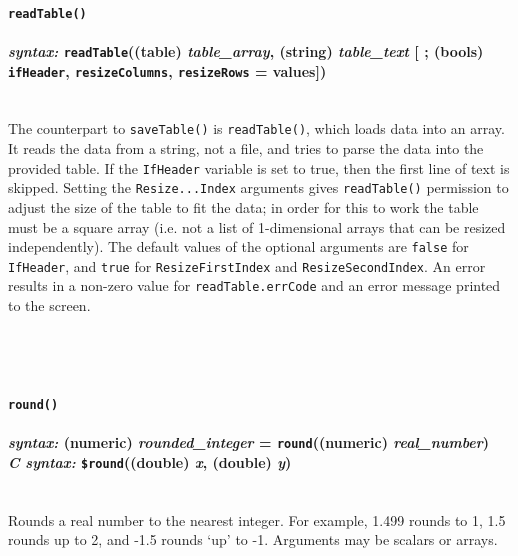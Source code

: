 \documentclass{article}
\begin{document}

\paragraph{\texttt{readTable()}\\\\
\normalfont \emph{syntax: } \texttt{readTable}((table) \emph{table\_array}, (string) \emph{table\_text} [ ; (bools) \texttt{ifHeader}, \texttt{resizeColumns}, \texttt{resizeRows} = values])\\\\}

The counterpart to \texttt{saveTable()} is \texttt{readTable()}, which loads data into an array.  It reads the data from a string, not a file, and tries to parse the data into the provided table.  If the \texttt{IfHeader} variable is set to true, then the first line of text is skipped.  Setting the \texttt{Resize...Index} arguments gives \verb#readTable()# permission to adjust the size of the table to fit the data; in order for this to work the table must be a square array (i.e. not a list of 1-dimensional arrays that can be resized independently).  The default values of the optional arguments are \texttt{false} for \texttt{IfHeader}, and \texttt{true} for \texttt{ResizeFirstIndex} and \texttt{ResizeSecondIndex}.  An error results in a non-zero value for \verb#readTable.errCode# and an error message printed to the screen.\\\\\\\\




\paragraph{\texttt{round()}\\\\
\normalfont \emph{syntax: } (numeric) \emph{rounded\_integer} = \texttt{round}((numeric) \emph{real\_number})\\
\normalfont \emph{C syntax: } \texttt{\$round}((double) \emph{x}, (double) \emph{y})\\\\}

Rounds a real number to the nearest integer.  For example, 1.499 rounds to 1, 1.5 rounds up to 2, and -1.5 rounds `up' to -1.  Arguments may be scalars or arrays.\\\\
\end{document}
